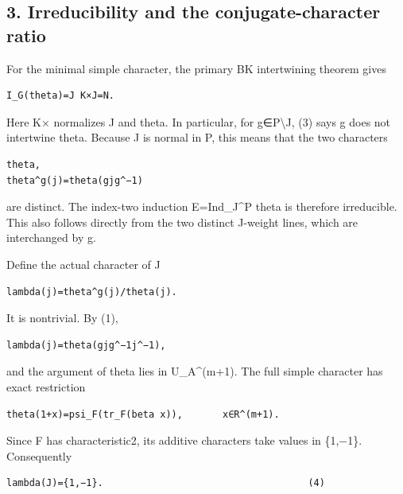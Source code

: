 \hypertarget{rank2-irreducibility-and-the-conjugate-character-ratio}{%
\subsection{3. Irreducibility and the conjugate-character
ratio}\label{rank2-irreducibility-and-the-conjugate-character-ratio}}

For the minimal simple character, the primary BK intertwining theorem
gives

\begin{Verbatim}[fontsize=\small,breaklines=true,breakanywhere=true]
I_G(theta)=J K×J=N.
\end{Verbatim}

Here K× normalizes J and theta. In particular, for g∈P\textbackslash J,
(3) says g does not intertwine theta. Because J is normal in P, this
means that the two characters

\begin{Verbatim}[fontsize=\small,breaklines=true,breakanywhere=true]
theta,
theta^g(j)=theta(gjg^−1)
\end{Verbatim}

are distinct. The index-two induction E=Ind\_J\^{}P theta is therefore
irreducible. This also follows directly from the two distinct J-weight
lines, which are interchanged by g.

Define the actual character of J

\begin{Verbatim}[fontsize=\small,breaklines=true,breakanywhere=true]
lambda(j)=theta^g(j)/theta(j).
\end{Verbatim}

It is nontrivial. By (1),

\begin{Verbatim}[fontsize=\small,breaklines=true,breakanywhere=true]
lambda(j)=theta(gjg^−1j^−1),
\end{Verbatim}

and the argument of theta lies in U\_A\^{}(m+1). The full simple
character has exact restriction

\begin{Verbatim}[fontsize=\small,breaklines=true,breakanywhere=true]
theta(1+x)=psi_F(tr_F(beta x)),       x∈R^(m+1).
\end{Verbatim}

Since F has characteristic2, its additive characters take values in
\{1,−1\}. Consequently

\begin{Verbatim}[fontsize=\small,breaklines=true,breakanywhere=true]
lambda(J)={1,−1}.                                    (4)
\end{Verbatim}

